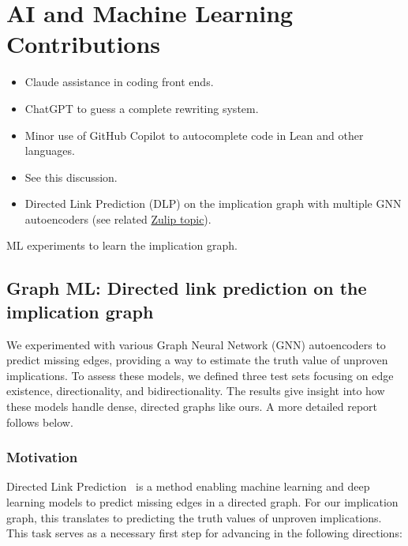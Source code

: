 \section{AI and Machine Learning Contributions}\label{ml-sec}


\begin{itemize}
  \item Claude assistance in coding front ends.
  \item ChatGPT to guess a complete rewriting system.
  \item Minor use of GitHub Copilot to autocomplete code in Lean and other languages.
  \item See this discussion.
  \item Directed Link Prediction (DLP) on the implication graph with multiple GNN autoencoders
    (see related \href{https://leanprover.zulipchat.com/#narrow/channel/458659-Equational/topic/Graph.20ML.3A.20Directed.20link.20prediction.20on.20the.20implication.20graph}{Zulip topic}).
\end{itemize}

ML experiments to learn the implication graph.

\subsection{Graph ML: Directed link prediction on the implication graph}
\label{sec:dlp}

We experimented with various Graph Neural Network (GNN) autoencoders to predict missing edges,
providing a way to estimate the truth value of unproven implications. To assess these models,
we defined three test sets focusing on edge existence, directionality, and bidirectionality.
The results give insight into how these models handle dense, directed graphs like ours.
A more detailed report follows below.


\subsubsection{Motivation}

Directed Link Prediction~\cite{Kipf2016} is a method enabling machine learning and deep learning
models to predict missing edges in a directed graph. For our implication graph, this translates to
predicting the truth values of unproven implications. This task serves as a necessary first step
for advancing in the following directions:

